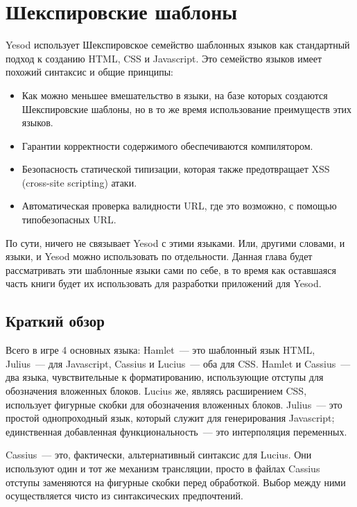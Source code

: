 \chapter{Шекспировские шаблоны}\label{chap:shakespeare}

Yesod использует Шекспировское семейство шаблонных языков как стандартный
подход к созданию HTML, CSS и Javascript. Это семейство языков имеет похожий
синтаксис и общие принципы:
\begin{itemize}
    \item Как можно меньшее вмешательство в языки, на базе которых создаются
        Шекспировские шаблоны, но в то же время использование преимуществ этих
        языков.

    \item Гарантии корректности содержимого обеспечиваются компилятором.

    \item Безопасность статической типизации, которая также предотвращает
        XSS (cross-site scripting) атаки.

    \item Автоматическая проверка валидности URL, где это возможно, с
        помощью типобезопасных URL.
\end{itemize}

По сути, ничего не связывает Yesod с этими языками. Или, другими словами, и
языки, и Yesod можно использовать по отдельности. Данная глава будет
рассматривать эти шаблонные языки сами по себе, в то время как оставшаяся часть
книги будет их использовать для разработки приложений для Yesod.

\section{Краткий обзор}

Всего в игре 4 основных языка: Hamlet~--- это шаблонный язык HTML, Julius~---
для Javascript, Cassius и Lucius~--- оба для CSS. Hamlet и Cassius~--- два
языка, чувствительные к форматированию, использующие отступы для обозначения
вложенных блоков. Lucius же, являясь расширением CSS, использует фигурные
скобки для обозначения вложенных блоков.  Julius~--- это простой однопроходный
язык, который служит для генерирования Javascript; единственная добавленная
функциональность~--- это интерполяция переменных.

\begin{remark}
    Cassius~--- это, фактически, альтернативный синтаксис для Lucius. Они
    используют один и тот же механизм трансляции, просто в файлах Cassius
    отступы заменяются на фигурные скобки перед обработкой. Выбор между ними
    осуществляется чисто из синтаксических предпочтений.
\end{remark}

